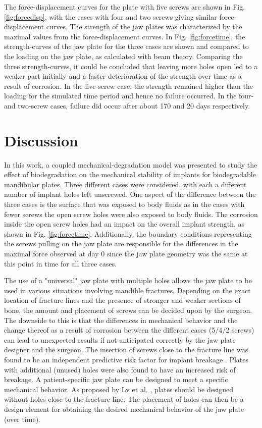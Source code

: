 The force-displacement curves for the plate with five screws are shown in Fig. \ref{fig:forcedisp}, with the cases with four and two screws giving similar force-displacement curves. The strength of the jaw plates was characterized by the maximal values from the force-displacement curves. In Fig. \ref{fig:forcetime}, the strength-curves of the jaw plate for the three cases are shown and compared to the loading on the jaw plate, as calculated with beam theory. Comparing the three strength-curves, it could be concluded that leaving more holes open led to a weaker part initially and a faster deterioration of the strength over time as a result of corrosion. In the five-screw case, the strength remained higher than the loading for the simulated time period and hence no failure occurred. In the four- and two-screw cases, failure did occur after about 170 and 20 days respectively.


\section{Discussion}

In this work, a coupled mechanical-degradation model was presented to study the effect of biodegradation on the mechanical stability of implants for biodegradable mandibular plates. Three different cases were considered, with each a different number of implant holes left unscrewed. One aspect of the difference between the three cases is the surface that was exposed to body fluids as in the cases with fewer screws the open screw holes were also exposed to body fluids. The corrosion inside the open screw holes had an impact on the overall implant strength, as shown in Fig. \ref{fig:forcetime}. Additionally, the boundary conditions representing the screws pulling on the jaw plate are responsible for the differences in the maximal force observed at day 0 since the jaw plate geometry was the same at this point in time for all three cases.

The use of a "universal" jaw plate with multiple holes allows the jaw plate to be used in various situations involving mandible fractures. Depending on the exact location of fracture lines and the presence of stronger and weaker sections of bone, the amount and placement of screws can be decided upon by the surgeon. The downside to this is that the differences in mechanical behavior and the change thereof as a result of corrosion between the different cases (5/4/2 screws) can lead to unexpected results if not anticipated correctly by the jaw plate designer and the surgeon. The insertion of screws close to the fracture line was found to be an independent predictive risk factor for implant breakage \cite{Lv2017}. Plates with additional (unused) holes were also found to have an increased risk of breakage. A patient-specific jaw plate can be designed to meet a specific mechanical behavior. As proposed by Lv et al. \cite{Lv2017}, plates should be designed without holes close to the fracture line. The placement of holes can then be a design element for obtaining the desired mechanical behavior of the jaw plate (over time).

